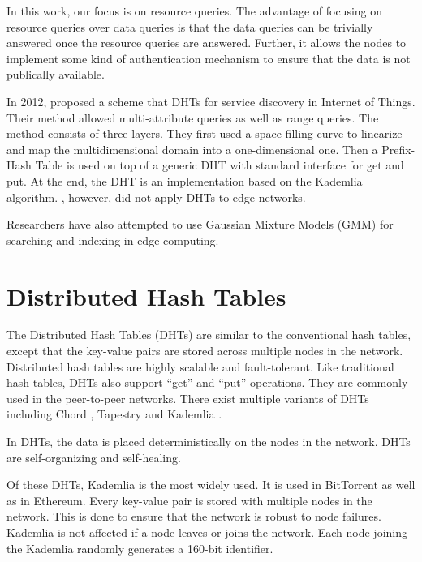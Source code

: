 In this work, our focus is on resource queries. The advantage of focusing on
resource queries over data queries is that the data queries can be trivially
answered once the resource queries are answered. Further, it allows the nodes to
implement some kind of authentication mechanism to ensure that the data is not
publically available.


In 2012, \citet{federicapaganelliDHTBasedDiscoveryService2012} proposed a scheme
that DHTs for service discovery in Internet of Things. Their method allowed
multi-attribute queries as well as range queries. The method consists of three
layers. They first used a space-filling curve to linearize and map the
multidimensional domain into a one-dimensional one. Then a Prefix-Hash Table is
used on top of a generic DHT with standard interface for get and put. At the
end, the DHT is an implementation based on the Kademlia algorithm.
\citet{federicapaganelliDHTBasedDiscoveryService2012}, however, did not apply
DHTs to edge networks.

Researchers have also attempted to use Gaussian Mixture Models (GMM) for
searching and indexing in edge computing.


\section{Distributed Hash Tables}

The Distributed Hash Tables (DHTs) are similar to the conventional hash tables,
except that the key-value pairs are stored across multiple nodes in the network.
Distributed hash tables are highly scalable and fault-tolerant. Like traditional
hash-tables, DHTs also support ``get'' and ``put'' operations. They are commonly
used in the peer-to-peer networks. There exist multiple variants of DHTs
including Chord \cite{ChordScalablePeertopeer}, Tapestry
\cite{zhaoTapestryResilientGlobalscale2004} and Kademlia
\cite{petarmaymounkovKademliaPeertoPeerInformation2002}.

In DHTs, the data is placed deterministically on the nodes in the network. DHTs
are self-organizing and self-healing.

Of these DHTs, Kademlia is the most widely used. It is used in BitTorrent
\cite{andrewloewensternDHTProtocol2008} as well as in Ethereum. Every key-value
pair is stored with multiple nodes in the network. This is done to ensure that
the network is robust to node failures. Kademlia is not affected if a node
leaves or joins the network. Each node joining the Kademlia randomly generates a
160-bit identifier.
\cite{petarmaymounkovKademliaPeertoPeerInformation2002}


